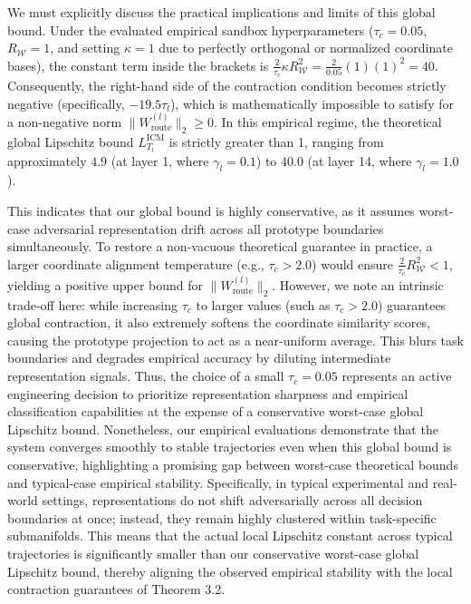 We must explicitly discuss the practical implications and limits of this global bound. Under the evaluated empirical sandbox hyperparameters ($\tau_c = 0.05$, $R_{\mathcal{W}} = 1$, and setting $\kappa = 1$ due to perfectly orthogonal or normalized coordinate bases), the constant term inside the brackets is $\frac{2}{\tau_c} \kappa R_{\mathcal{W}}^2 = \frac{2}{0.05} (1)(1)^2 = 40$. Consequently, the right-hand side of the contraction condition becomes strictly negative (specifically, $-19.5 \tau_l$), which is mathematically impossible to satisfy for a non-negative norm $\|W_{\text{route}}^{(l)}\|_2 \ge 0$. In this empirical regime, the theoretical global Lipschitz bound $L_{T_l}^{\text{ICM}}$ is strictly greater than 1, ranging from approximately $4.9$ (at layer 1, where $\gamma_l = 0.1$) to $40.0$ (at layer 14, where $\gamma_l = 1.0$). 

This indicates that our global bound is highly conservative, as it assumes worst-case adversarial representation drift across all prototype boundaries simultaneously. To restore a non-vacuous theoretical guarantee in practice, a larger coordinate alignment temperature (e.g., $\tau_c > 2.0$) would ensure $\frac{2}{\tau_c} R_{\mathcal{W}}^2 < 1$, yielding a positive upper bound for $\|W_{\text{route}}^{(l)}\|_2$. However, we note an intrinsic trade-off here: while increasing $\tau_c$ to larger values (such as $\tau_c > 2.0$) guarantees global contraction, it also extremely softens the coordinate similarity scores, causing the prototype projection to act as a near-uniform average. This blurs task boundaries and degrades empirical accuracy by diluting intermediate representation signals. Thus, the choice of a small $\tau_c = 0.05$ represents an active engineering decision to prioritize representation sharpness and empirical classification capabilities at the expense of a conservative worst-case global Lipschitz bound. Nonetheless, our empirical evaluations demonstrate that the system converges smoothly to stable trajectories even when this global bound is conservative, highlighting a promising gap between worst-case theoretical bounds and typical-case empirical stability. Specifically, in typical experimental and real-world settings, representations do not shift adversarially across all decision boundaries at once; instead, they remain highly clustered within task-specific submanifolds. This means that the actual local Lipschitz constant across typical trajectories is significantly smaller than our conservative worst-case global Lipschitz bound, thereby aligning the observed empirical stability with the local contraction guarantees of Theorem 3.2.

